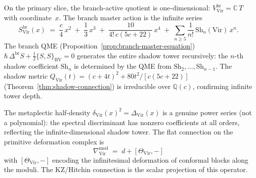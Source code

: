 \begin{computation}
\label{comp:virasoro-branch-bv}
On the primary slice, the branch-active quotient is
one-dimensional: $V_{\mathrm{Vir}}^{\mathrm{br}} = \mathbb{C}\,T$
with coordinate~$x$.  The branch master action is the infinite
series
\begin{equation}\label{eq:virasoro-branch-action}
S_{\mathrm{Vir}}^{\mathrm{br}}(x)
\;=\;
\frac{c}{4}\,x^2
\;+\;
\frac{1}{3}\,x^3
\;+\;
\frac{10}{4!\,c(5c{+}22)}\,x^4
\;+\;
\sum_{n \geq 5} \frac{1}{n!}\,\mathrm{Sh}_n(\mathrm{Vir})\,x^n.
\end{equation}
The branch QME
\textup{(}Proposition~\textup{\ref{prop:branch-master-equation})}
$\hbar\,\Delta^{\mathrm{br}} S + \frac{1}{2}\{S,S\}_{\mathrm{BV}} = 0$
generates the entire shadow tower recursively: the $n$-th shadow
coefficient $\mathrm{Sh}_n$ is determined by the QME from
$\mathrm{Sh}_2, \ldots, \mathrm{Sh}_{n-1}$.  The shadow
metric $Q_{\mathrm{Vir}}(t) = (c + 4t)^2 + 80t^2/[c(5c{+}22)]$
\textup{(}Theorem~\textup{\ref{thm:shadow-connection})} is
irreducible over $\mathbb{Q}(c)$, confirming infinite tower depth.

The metaplectic half-density
$\delta_{\mathrm{Vir}}(x)^2 = \Delta_{\mathrm{Vir}}(x)$
is a genuine power series \textup{(}not a polynomial\textup{)}: the
spectral discriminant has nonzero coefficients at all orders,
reflecting the infinite-dimensional shadow tower.  The flat
connection on the primitive deformation complex is
\begin{equation}\label{eq:virasoro-flat-connection}
\nabla^{\mathrm{mod}}_{\mathrm{Vir}}
\;=\;
d + [\Theta_{\mathrm{Vir}}, -]
\end{equation}
with $[\Theta_{\mathrm{Vir}}, -]$ encoding the infinitesimal
deformation of conformal blocks along the moduli.  The
KZ/Hitchin connection is the scalar projection of this operator.
\end{computation}

